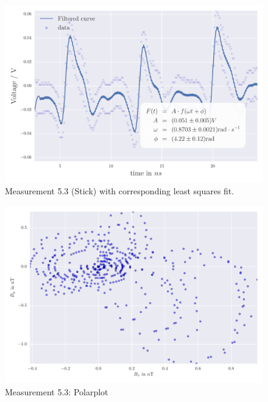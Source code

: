 \begin{figure}[H]
    \centering
    \includegraphics[width=0.7\linewidth]{analysis/figures/fit5_3}
    \caption{Measurement 5.3 (Stick) with corresponding least squares fit.}
    \label{fig:5_3_plot}
\end{figure}
\begin{figure}[H]
    \centering
    \includegraphics[width=0.7\linewidth]{analysis/figures/polar5_3}
    \caption{Measurement 5.3: Polarplot}
    \label{fig:5_3_polar}
\end{figure}


